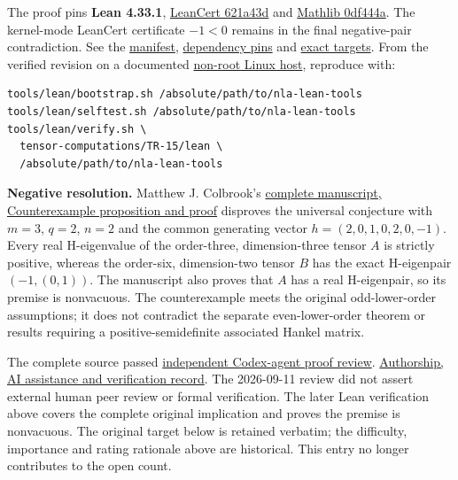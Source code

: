 \documentclass[11pt,a4paper]{article}
\makeatletter
\renewcommand{\subsection}{\Needspace{4\baselineskip}\@startsection{subsection}{2}{0pt}{9pt plus 1pt minus 1pt}{3pt}{\sffamily\bfseries\normalsize\color{ink}}}
\makeatother
\begin{document}
The proof pins \textbf{Lean 4.33.1},
\href{https://github.com/alerad/leancert/tree/621a43d7cf21f87872392a01e874f2f1dbddc926}{LeanCert
621a43d} and
\href{https://github.com/leanprover-community/mathlib4/tree/0df444a360eaa60ab8c11dca51a86af692955474}{Mathlib
0df444a}. The kernel-mode LeanCert certificate \(-1<0\) remains in the
final negative-pair contradiction. See the
\href{https://github.com/ajt60gaibb/OpenProblemsInNLA/blob/main/tensor-computations/TR-15/lean/formalization.yaml}{manifest},
\href{https://github.com/ajt60gaibb/OpenProblemsInNLA/blob/main/tensor-computations/TR-15/lean/lake-manifest.json}{dependency
pins} and
\href{https://github.com/ajt60gaibb/OpenProblemsInNLA/blob/main/tensor-computations/TR-15/lean/NUMERICAL_TARGETS.md}{exact
targets}. From the verified revision on a documented
\href{https://github.com/ajt60gaibb/OpenProblemsInNLA/blob/main/tools/lean/HARNESS.md}{non-root
Linux host}, reproduce with:

\begin{verbatim}
tools/lean/bootstrap.sh /absolute/path/to/nla-lean-tools
tools/lean/selftest.sh /absolute/path/to/nla-lean-tools
tools/lean/verify.sh \
  tensor-computations/TR-15/lean \
  /absolute/path/to/nla-lean-tools
\end{verbatim}

\subsection{Resolution --- 2026-09-11}\label{resolution-2026-09-11}

\textbf{Negative resolution.} Matthew J. Colbrook's
\href{https://github.com/ajt60gaibb/OpenProblemsInNLA/blob/main/references/colbrook-unclaimed-2026-09-11/manuscripts/TR-15.md}{complete
manuscript, Counterexample proposition and proof} disproves the
universal conjecture with \(m=3\), \(q=2\), \(n=2\) and the common
generating vector \(h=(2,0,1,0,2,0,-1)\). Every real H-eigenvalue of the
order-three, dimension-three tensor \(A\) is strictly positive, whereas
the order-six, dimension-two tensor \(B\) has the exact H-eigenpair
\((-1,(0,1))\). The manuscript also proves that \(A\) has a real
H-eigenpair, so its premise is nonvacuous. The counterexample meets the
original odd-lower-order assumptions; it does not contradict the
separate even-lower-order theorem or results requiring a
positive-semidefinite associated Hankel matrix.

The complete source passed
\href{https://github.com/ajt60gaibb/OpenProblemsInNLA/blob/main/references/colbrook-unclaimed-2026-09-11/verification/reviews/TR-15-review.md}{independent
Codex-agent proof review}.
\href{https://github.com/ajt60gaibb/OpenProblemsInNLA/blob/main/references/colbrook-unclaimed-2026-09-11/README.md}{Authorship,
AI assistance and verification record}. The 2026-09-11 review did not
assert external human peer review or formal verification. The later Lean
verification above covers the complete original implication and proves
the premise is nonvacuous. The original target below is retained
verbatim; the difficulty, importance and rating rationale above are
historical. This entry no longer contributes to the open count.
\end{document}
